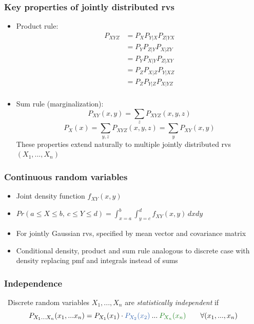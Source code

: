 \documentclass[12pt]{article}
\begin{document}
\subsubsection{Key properties of jointly distributed rvs}
\begin{itemize}
\item Product rule:
\begin{align*}
P_{XYZ} &= P_XP_{Y|X}P_{Z|YX} \\
&= P_YP_{Z|Y}P_{X|ZY}\\
&= P_YP_{X|Y}P_{Z|XY}\\
&= P_ZP_{X|Z}P_{Y|XZ}\\
& = P_ZP_{Y|Z}P_{X|YZ}\\
\end{align*}

\item Sum rule (marginalization):
$$ P_{XY}(x,y) = \sum_zP_{XYZ}(x,y,z)$$
$$ P_X(x) = \sum_{y,z}P_{XYZ}(x,y,z) = \sum_yP_{XY}(x,y)$$
These properties extend naturally to multiple jointly distributed rvs $(X_1,...,X_n)$
\end{itemize}

\subsubsection{Continuous random variables}
\begin{itemize}
\item Joint density function $f_{XY}(x,y)$

\item $Pr(a \le X \le b, \ c \le Y \le d) = \int_{x = a}^{b} \int_{y=c}^{d}f_{XY}(x,y) \,dxdy$

\item For jointly Gaussian rvs, specified by mean vector and covariance matrix

\item Conditional density, product and sum rule analogous to discrete case with density replacing pmf and integrals instead of sums
\end{itemize}

\subsubsection{Independence}
\quad \ \. Discrete random variables $X_1,...,X_n$ are \textit{statistically \textcolor{blue1}{independent}} if 
$$P_{X_1...X_n}(x_1,...x_n) = P_{X_1}(x_1) \cdot  \textcolor{blue1}{P_{X_2}(x_2)} \: ... \: \textcolor{green}{P_{X_n}(x_n)} \qquad \forall (x_1,...,x_n)$$
\end{document}
